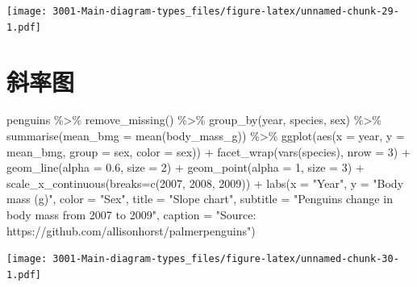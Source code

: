 \documentclass[
]{book}
\newenvironment{Shaded}{\begin{snugshade}}{\end{snugshade}}
\newcommand{\AttributeTok}[1]{\textcolor[rgb]{0.77,0.63,0.00}{#1}}
\newcommand{\DecValTok}[1]{\textcolor[rgb]{0.00,0.00,0.81}{#1}}
\newcommand{\FloatTok}[1]{\textcolor[rgb]{0.00,0.00,0.81}{#1}}
\newcommand{\FunctionTok}[1]{\textcolor[rgb]{0.00,0.00,0.00}{#1}}
\newcommand{\NormalTok}[1]{#1}
\newcommand{\SpecialCharTok}[1]{\textcolor[rgb]{0.00,0.00,0.00}{#1}}
\newcommand{\StringTok}[1]{\textcolor[rgb]{0.31,0.60,0.02}{#1}}
\begin{document}
\texttt{[image: 3001-Main-diagram-types\_files/figure-latex/unnamed-chunk-29-1.pdf]}

\hypertarget{ux659cux7387ux56fe}{%
\section{斜率图}\label{ux659cux7387ux56fe}}

\begin{Shaded}
\begin{Highlighting}[]
\NormalTok{penguins }\SpecialCharTok{\%\textgreater{}\%}
    \FunctionTok{remove\_missing}\NormalTok{() }\SpecialCharTok{\%\textgreater{}\%}
    \FunctionTok{group\_by}\NormalTok{(year, species, sex) }\SpecialCharTok{\%\textgreater{}\%}
    \FunctionTok{summarise}\NormalTok{(}\AttributeTok{mean\_bmg =} \FunctionTok{mean}\NormalTok{(body\_mass\_g)) }\SpecialCharTok{\%\textgreater{}\%}
    \FunctionTok{ggplot}\NormalTok{(}\FunctionTok{aes}\NormalTok{(}\AttributeTok{x =}\NormalTok{ year, }\AttributeTok{y =}\NormalTok{ mean\_bmg, }\AttributeTok{group =}\NormalTok{ sex,}
               \AttributeTok{color =}\NormalTok{ sex)) }\SpecialCharTok{+}
    \FunctionTok{facet\_wrap}\NormalTok{(}\FunctionTok{vars}\NormalTok{(species), }\AttributeTok{nrow =} \DecValTok{3}\NormalTok{) }\SpecialCharTok{+}
    \FunctionTok{geom\_line}\NormalTok{(}\AttributeTok{alpha =} \FloatTok{0.6}\NormalTok{, }\AttributeTok{size =} \DecValTok{2}\NormalTok{) }\SpecialCharTok{+}
    \FunctionTok{geom\_point}\NormalTok{(}\AttributeTok{alpha =} \DecValTok{1}\NormalTok{, }\AttributeTok{size =} \DecValTok{3}\NormalTok{) }\SpecialCharTok{+}
    \FunctionTok{scale\_x\_continuous}\NormalTok{(}\AttributeTok{breaks=}\FunctionTok{c}\NormalTok{(}\DecValTok{2007}\NormalTok{, }\DecValTok{2008}\NormalTok{, }\DecValTok{2009}\NormalTok{)) }\SpecialCharTok{+}
      \FunctionTok{labs}\NormalTok{(}\AttributeTok{x =} \StringTok{"Year"}\NormalTok{, }
           \AttributeTok{y =} \StringTok{"Body mass (g)"}\NormalTok{,}
           \AttributeTok{color =} \StringTok{"Sex"}\NormalTok{,}
          \AttributeTok{title =} \StringTok{"Slope chart"}\NormalTok{, }
          \AttributeTok{subtitle =} \StringTok{"Penguin\textquotesingle{}s change in body mass from 2007 to 2009"}\NormalTok{,}
          \AttributeTok{caption =} \StringTok{"Source: https://github.com/allisonhorst/palmerpenguins"}\NormalTok{)}
\end{Highlighting}
\end{Shaded}

\texttt{[image: 3001-Main-diagram-types\_files/figure-latex/unnamed-chunk-30-1.pdf]}
\end{document}
